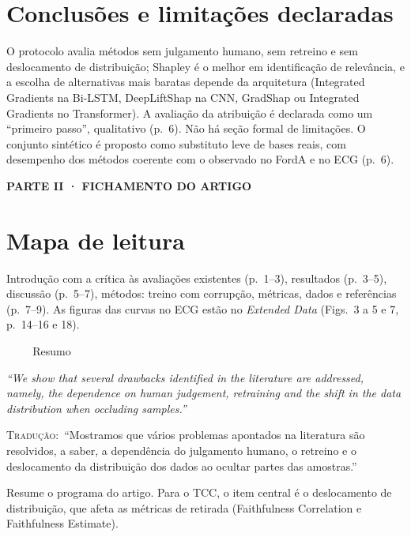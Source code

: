 \documentclass[11pt,a4paper]{article}
\newcommand{\pagechip}[1]{{\setlength{\fboxsep}{1.5pt}\colorbox{cAcc}{\textcolor{white}{\scriptsize\texttt{#1}}}}}
\newcommand{\partbar}[1]{\par\vspace{1.2em}\noindent\colorbox{black!80}{\parbox{\dimexpr\linewidth-2\fboxsep}{\color{white}\bfseries\sffamily\MakeUppercase{#1}}}\par\vspace{0.4em}}
\newenvironment{origquote}{\par\itshape\small}{\par}
\newenvironment{tradquote}{\par\small\textsc{Tradução:}\ }{\par}
\newcommand{\explab}[1]{\par\smallskip{\small\color{cAcc}\textbf{\MakeUppercase{#1}}}\par}
\begin{document}
\section{Conclusões e limitações declaradas}
O protocolo avalia métodos sem julgamento humano, sem retreino e sem deslocamento de distribuição; Shapley é o melhor em identificação de relevância, e a escolha de alternativas mais baratas depende da arquitetura (Integrated Gradients na Bi-LSTM, DeepLiftShap na CNN, GradShap ou Integrated Gradients no Transformer). A avaliação da atribuição é declarada como um “primeiro passo”, qualitativo (p.~6). Não há seção formal de limitações. O conjunto sintético é proposto como substituto leve de bases reais, com desempenho dos métodos coerente com o observado no FordA e no ECG (p.~6).

\partbar{Parte II · Fichamento do artigo}

\section{Mapa de leitura}
Introdução com a crítica às avaliações existentes (p.~1--3), resultados (p.~3--5), discussão (p.~5--7), métodos: treino com corrupção, métricas, dados e referências (p.~7--9). As figuras das curvas no ECG estão no \textit{Extended Data} (Figs.~3 a 5 e 7, p.~14--16 e 18).

\begin{citacard}{\pagechip{p. 1} Resumo}
\begin{origquote}“We show that several drawbacks identified in the literature are addressed, namely, the dependence on human judgement, retraining and the shift in the data distribution when occluding samples.”\end{origquote}
\begin{tradquote}“Mostramos que vários problemas apontados na literatura são resolvidos, a saber, a dependência do julgamento humano, o retreino e o deslocamento da distribuição dos dados ao ocultar partes das amostras.”\end{tradquote}
\explab{Explicação}
Resume o programa do artigo. Para o TCC, o item central é o deslocamento de distribuição, que afeta as métricas de retirada (Faithfulness Correlation e Faithfulness Estimate).
\end{citacard}
\end{document}
